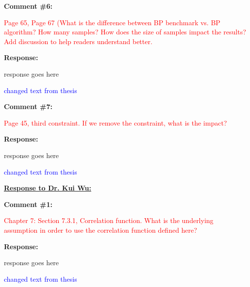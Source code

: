 \documentclass[journal]{IEEEtran}
\begin{document}
\vspace{30pt}
\textbf{Comment \#6:}
\begin{adjustwidth}{2.5em}{0pt}
\singlespacing \vspace{-10pt}
\textcolor{red}{Page 65, Page 67 (What is the difference between BP benchmark vs. BP algorithm? How many samples? How does the size of samples impact the results? Add discussion to help readers understand better.}
\end{adjustwidth}

\vspace{10pt}
\textbf{Response:}
\begin{adjustwidth}{2.5em}{0pt}
response goes here

\vspace{10pt}
\noindent\textcolor{blue}{changed text from thesis}
\end{adjustwidth}


\vspace{30pt}
\textbf{Comment \#7:}
\begin{adjustwidth}{2.5em}{0pt}
\singlespacing \vspace{-10pt}
\textcolor{red}{Page 45, third constraint. If we remove the constraint, what is the impact?}
\end{adjustwidth}

\vspace{10pt}
\textbf{Response:}
\begin{adjustwidth}{2.5em}{0pt}
response goes here

\vspace{10pt}
\noindent\textcolor{blue}{changed text from thesis}
\end{adjustwidth} 
 
 
 
 
 
\vspace{50pt}
  \Large
\noindent \textbf{\underline{Response to Dr. Kui Wu:}}
 \large

\vspace{10pt}
\textbf{Comment \#1:}
\begin{adjustwidth}{2.5em}{0pt}
\singlespacing \vspace{-10pt}
\textcolor{red}{Chapter 7: Section 7.3.1, Correlation function. What is the underlying assumption in order to use the correlation function defined here?}
\end{adjustwidth}

\vspace{10pt}
\textbf{Response:}
\begin{adjustwidth}{2.5em}{0pt}
response goes here

\vspace{10pt}
\noindent\textcolor{blue}{changed text from thesis}
\end{adjustwidth}
\end{document}
